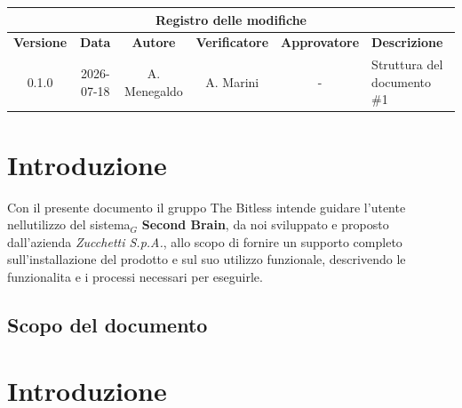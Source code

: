 \documentclass[a4paper, 10pt, colorlinks=true, linkcolor=black, urlcolor=blue, citecolor=blue, hidelinks]{article}
\renewcommand{\arraystretch}{1.2}
\begin{document}
\setlength{\emergencystretch}{3em}

\newcommand{\titolo}{Manuale Utente}
\newcommand{\dataverbale}{}
\newcommand{\dataversione}{2026-07-18}
\newcommand{\versione}{0.1.0}
\newcommand{\stato}{Stesura}
\newcommand{\destinatari}{The Bitless, prof. Tullio Vardanega, prof. Riccardo Cardin}
\def\templatedir{../../../templates}

\begin{titlepage}

\end{titlepage}

\newpage
\begin{center}
    \small
    \renewcommand{\arraystretch}{1.25}
    \begin{tabularx}{\textwidth}{|c|c|c|c|c|X|}
        \hline
        \multicolumn{6}{|c|}{\textbf{Registro delle modifiche}} \\
        \hline
        \textbf{Versione} & \textbf{Data} & \textbf{Autore} & \textbf{Verificatore} & \textbf{Approvatore} & \textbf{Descrizione} \\
        \hline
        0.1.0 & 2026-07-18 & A. Menegaldo & A. Marini & - & Struttura del documento \#1 \\
        \hline
    \end{tabularx}
\end{center}
\newpage

\newpage
{} %
\tableofcontents
\newpage
\newpage



\newpage

\section{Introduzione}
Con il presente documento il gruppo The Bitless intende guidare l'utente nellutilizzo del
sistema$_G$ \textbf{Second Brain}, da noi sviluppato e proposto dall'azienda \textit{Zucchetti S.p.A.}, allo scopo di
fornire un supporto completo sull'installazione del prodotto e sul suo utilizzo funzionale,
descrivendo le funzionalita e i processi necessari per eseguirle.
\subsection{Scopo del documento}

\section{Introduzione}
\end{document}
